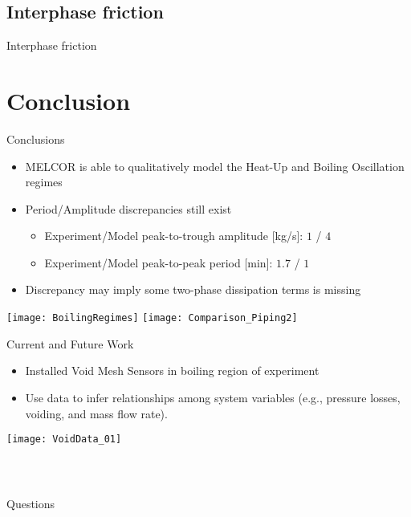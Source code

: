 \documentclass[10pt,t,xcolor=table]{UWMadBeamer}
\begin{document}
\subsection{Interphase friction}

\begin{frame}{Interphase friction}
\end{frame}


\section{Conclusion}

\begin{frame} {Conclusions}
    \begin{itemize}
        \item MELCOR is able to qualitatively model the Heat-Up and Boiling Oscillation regimes
        \item Period/Amplitude discrepancies still exist
        \begin{itemize}
            \item Experiment/Model peak-to-trough amplitude [kg/s]: $1$ / $4$
            \item Experiment/Model peak-to-peak period [min]: $1.7$ / $1$
        \end{itemize}
        \item Discrepancy may imply some two-phase dissipation terms is missing
    \end{itemize}
    \vfill
    {
    \centering
    \texttt{[image: BoilingRegimes]}%
    \hfill
    \texttt{[image: Comparison\_Piping2]}%
    \hfill
    }
\end{frame}

\begin{frame} {Current and Future Work}

    \begin{itemize}
        \item Installed Void Mesh Sensors in boiling region of experiment
        \item Use data to infer relationships among system variables (e.g., pressure losses, voiding, and mass flow rate).
    \end{itemize}

        {
        \centering
        \hfill
        \texttt{[image: VoidData\_01]}%
        \hfill
        }
        
\end{frame}





\begin{frame}
    \frametitle{~\ }
    \vbox{}\vfill
    \hfill{\Large Questions}\hfill
    \vbox{}\vfill
\end{frame}
\end{document}
